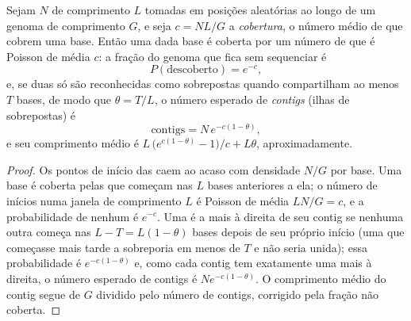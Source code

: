 \begin{theorem}\label{thm:b3:genomics:lander-waterman}
Sejam $N$  de comprimento $L$ tomadas em posições aleatórias ao
longo de um genoma de comprimento $G$, e seja $c = NL/G$ a
\emph{cobertura}, o número médio de  que cobrem uma base.
Então uma dada base é coberta por um número de  que é Poisson
de média $c$: a fração do genoma que fica sem sequenciar é
\[
P(\text{descoberto}) = e^{-c},
\]
e, se duas  só são reconhecidas como sobrepostas quando
compartilham ao menos $T$ bases, de modo que $\theta = T/L$, o número
esperado de \emph{contigs} (ilhas de  sobrepostas) é
\[
\text{contigs} = N\,e^{-c(1-\theta)},
\]
e seu comprimento médio é $L\,\bigl(e^{c(1-\theta)} - 1\bigr)/c + L\theta$,
aproximadamente.
\end{theorem}
\begin{proof}
Os pontos de início das  caem ao acaso com densidade $N/G$ por
base. Uma base é coberta pelas  que começam nas $L$ bases
anteriores a ela; o número de inícios numa janela de comprimento $L$ é
Poisson de média $LN/G
= c$, e a probabilidade de nenhum é $e^{-c}$.
Uma  é a mais à direita de seu contig se nenhuma outra 
começa nas $L - T = L(1-\theta)$ bases depois de seu próprio início
(uma  que começasse mais tarde a sobreporia em menos de $T$ e
não seria unida); essa probabilidade é $e^{-c(1-\theta)}$ e, como cada
contig tem exatamente uma  mais à direita, o número esperado de
contigs é $N e^{-c(1-\theta)}$. O comprimento médio do contig segue de
$G$ dividido pelo número de contigs, corrigido pela fração não coberta.
\end{proof}

